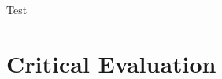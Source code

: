 \documentclass[ %
                    author={Alexander Hill},
                supervisor={Dr. Benjamin Sach},
                    degree={MEng},
                     title={MARMOSET: Multi Agent Real-time Multi-core Online
                     Simulation for Efficient Transportation},
                  subtitle={},
                      type={research},
                      year={2016} ]{dissertation}
\begin{document}
Test






\chapter{Critical Evaluation}
\label{chap:evaluation}


\end{document}
